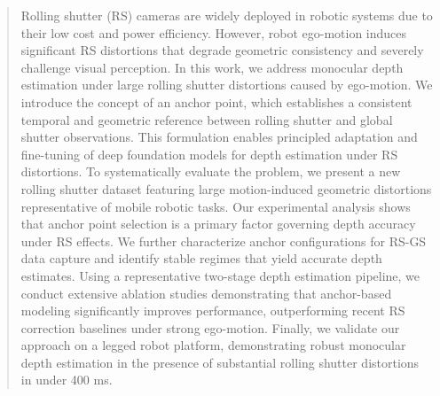 \begin{abstract}
Rolling shutter (RS) cameras are widely deployed in robotic systems due to their low cost and power efficiency. However, robot ego-motion induces significant RS distortions that degrade geometric consistency and severely challenge visual perception. In this work, we address monocular depth estimation under large rolling shutter distortions caused by ego-motion. We introduce the concept of an anchor point, which establishes a consistent temporal and geometric reference between rolling shutter and global shutter observations. This formulation enables principled adaptation and fine-tuning of deep foundation models for depth estimation under RS distortions. To systematically evaluate the problem, we present a new rolling shutter dataset featuring large motion-induced geometric distortions representative of mobile robotic tasks. Our experimental analysis shows that anchor point selection is a primary factor governing depth accuracy under RS effects. We further characterize anchor configurations for RS-GS data capture and identify stable regimes that yield accurate depth estimates. Using a representative two-stage depth estimation pipeline, we conduct extensive ablation studies demonstrating that anchor-based modeling significantly improves performance, outperforming recent RS correction baselines under strong ego-motion. Finally, we validate our approach on a legged robot platform, demonstrating robust monocular depth estimation in the presence of substantial rolling shutter distortions in under 400 ms.
\end{abstract}